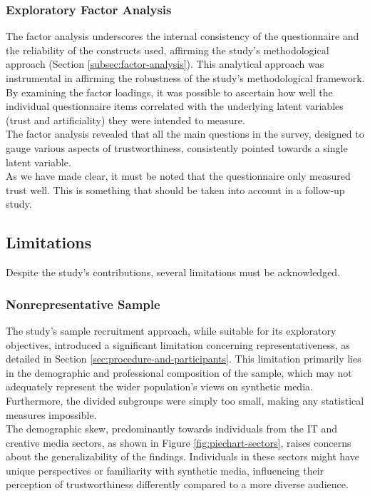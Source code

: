 \documentclass[
  a4paper,  %
  twoside,  %
  bibliography=totoc,
  headsepline,
  cleardoublepage=empty,
  parskip=half,
  draft=false
]{scrbook}
\begin{document}
\subsubsection{Exploratory Factor Analysis}
The factor analysis underscores the internal consistency of the questionnaire and the reliability of the constructs used, affirming the study's methodological approach (Section \ref{subsec:factor-analysis}). This analytical approach was instrumental in affirming the robustness of the study's methodological framework. By examining the factor loadings, it was possible to ascertain how well the individual questionnaire items correlated with the underlying latent variables (trust and artificiality) they were intended to measure. \\
The factor analysis revealed that all the main questions in the survey, designed to gauge various aspects of trustworthiness, consistently pointed towards a single latent variable. \\
As we have made clear, it must be noted that the questionnaire only measured trust well. This is something that should be taken into account in a follow-up study.

\subsection{Limitations}
\label{subsec:limitations}
Despite the study's contributions, several limitations must be acknowledged.

\subsubsection{Nonrepresentative Sample}
The study's sample recruitment approach, while suitable for its exploratory objectives, introduced a significant limitation concerning representativeness, as detailed in Section \ref{sec:procedure-and-participants}. This limitation primarily lies in the demographic and professional composition of the sample, which may not adequately represent the wider population's views on synthetic media. Furthermore, the divided subgroups were simply too small, making any statistical measures impossible. \\
The demographic skew, predominantly towards individuals from the IT and creative media sectors, as shown in Figure \ref{fig:piechart-sectors}, raises concerns about the generalizability of the findings. Individuals in these sectors might have unique perspectives or familiarity with synthetic media, influencing their perception of trustworthiness differently compared to a more diverse audience.
\end{document}
